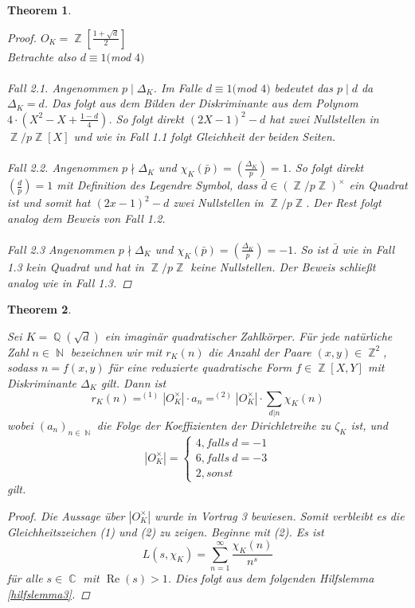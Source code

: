\documentclass[10pt,a4paper]{article}
\theoremstyle{plain}
\newtheorem{thm}{Theorem}[section]
\theoremstyle{definition}
\theoremstyle{remark}
\DeclareMathOperator{\C}{\mathbb{C}}
\DeclareMathOperator{\Q}{\mathbb{Q}}
\DeclareMathOperator{\Z}{\mathbb{Z}}
\DeclareMathOperator{\N}{\mathbb{N}}
\DeclareMathOperator{\re}{Re}
\begin{document}
\begin{thm}
\begin{proof}
$O_K= \Z[\frac{1+\sqrt{d}}{2}]$ \\
Betrachte also $d\equiv 1 ($mod $ 4)$ 
\\
\\
\textit{Fall 2.1.}
Angenommen $p \mid \Delta_K$. Im Falle $d\equiv 1 ($mod $ 4)$ bedeutet das $p\mid d$ da  $\Delta_K=d$. Das folgt aus dem Bilden der Diskriminante aus dem Polynom $4\cdot(X^2-X+\frac{1-d}{4})$. So folgt direkt $(2X-1)^2-d$ hat zwei Nullstellen in $\Z/p\Z[X]$ und wie in Fall 1.1 folgt Gleichheit der beiden Seiten.
\\
\\
\textit{Fall 2.2.}
Angenommen $p\nmid \Delta_K$ und $\chi_K(\bar{p})=(\frac{\Delta_K}{p})=1$. So folgt direkt $(\frac{d}{p})=1$ mit Definition des Legendre Symbol, dass $\bar{d} \in (\Z/p\Z)^\times$ ein Quadrat ist und somit hat $(2x-1)^2-d$ zwei Nullstellen in $\Z/p\Z$. Der Rest folgt analog dem Beweis von Fall 1.2.
\\
\\
\textit{Fall 2.3}
Angenommen $p\nmid \Delta_K$ und $\chi_K(\bar{p})=(\frac{\Delta_K}{p})=-1$. So ist $\bar{d}$ wie in Fall 1.3 kein Quadrat und hat in $\Z/p\Z$ keine Nullstellen. Der Beweis schließt analog wie in Fall 1.3.


\end{proof}
\end{thm}

\begin{thm}\label{theo16}

Sei $K=\Q(\sqrt{d})$ ein imaginär quadratischer Zahlkörper. Für jede natürliche Zahl $n \in \N$ bezeichnen wir mit $r_K(n)$ die Anzahl der Paare $(x,y) \in \Z^2$, sodass $n = f(x,y)$ für eine reduzierte quadratische Form $f \in \Z[X,Y]$ mit Diskriminante $\Delta_K$ gilt. Dann ist $$r_K(n) =^{(1)} |O_K^\times|\cdot a_n =^{(2)} |O_K^\times|\cdot \sum_{d|n}\chi_K(n)$$wobei $(a_n)_{n \in \N}$ die Folge der Koeffizienten der Dirichletreihe zu $\zeta_K$ ist, und $$|O_K^\times|=\begin{cases}4, falls \ d = -1\\6, falls \ d = -3\\2, sonst\end{cases}$$ gilt.
\\
\begin{proof}\renewcommand{\qedsymbol}{}
Die Aussage über $|O_K^\times|$ wurde in Vortrag 3 bewiesen. Somit verbleibt es die Gleichheitszeichen (1) und (2) zu zeigen. Beginne mit (2). Es ist $$L(s,\chi_K)=\sum_{n=1}^{\infty}\frac{\chi_K(n)}{n^s}$$ für alle $s \in \C $ mit $ \re(s) > 1$. Dies folgt aus dem folgenden Hilfslemma \ref{hilfslemma3}.
 
 \end{proof}
 \end{thm}
 
\end{document}
